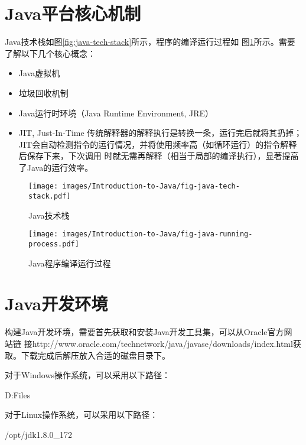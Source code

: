 \section{Java平台核心机制}


Java技术栈如图\ref{fig:java-tech-stack}所示，程序的编译运行过程如
图\ref{fig:java-running-process}所示。需要了解以下几个核心概念：

\begin{itemize}
\item Java虚拟机
\item 垃圾回收机制
\item Java运行时环境（Java Runtime Environment, JRE）
\item JIT, Just-In-Time 传统解释器的解释执行是转换一条，运行完后就将其扔掉；
  JIT会自动检测指令的运行情况，并将使用频率高（如循环运行）的指令解释后保存下来，下次调用
  时就无需再解释（相当于局部的编译执行），显著提高了Java的运行效率。
\end{itemize}

\begin{figure}[htb]
  \begin{minipage}[t]{0.4\linewidth}
    \centering
    \texttt{[image: images/Introduction-to-Java/fig-java-tech-stack.pdf]}
    \caption{Java技术栈}
    \label{fig:java-tech-stack}
  \end{minipage}
  \begin{minipage}[t]{0.6\linewidth}
    \centering
    \texttt{[image: images/Introduction-to-Java/fig-java-running-process.pdf]}
    \caption{Java程序编译运行过程}
    \label{fig:java-running-process}
  \end{minipage}
\end{figure}

\section{Java开发环境}
构建Java开发环境，需要首先获取和安装Java开发工具集，可以从Oracle官方网
站链
接http://www.oracle.com/technetwork/java/javase/downloads/index.html获
取。下载完成后解压放入合适的磁盘目录下。

对于Windows操作系统，可以采用以下路径：

\begin{shCode}
  D:\Program Files\Java
\end{shCode}

对于Linux操作系统，可以采用以下路径：

\begin{shCode}
  /opt/jdk1.8.0_172
\end{shCode}

